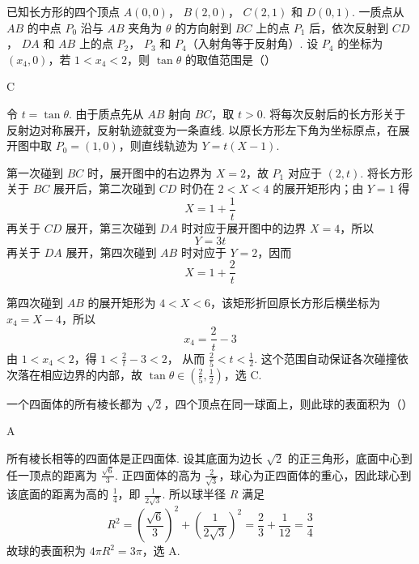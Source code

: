 \begin{problem}
已知长方形的四个顶点 \(A(0, 0)\)， \(B(2, 0)\)， \(C(2, 1)\) 和 \(D(0, 1)\). 一质点从 \(AB\) 的中点 \(P_0\) 沿与 \(AB\) 夹角为 \(\theta\) 的方向射到 \(BC\) 上的点 \(P_1\) 后，依次反射到 \(CD\)， \(DA\) 和 \(AB\) 上的点 \(P_2\)， \(P_3\) 和 \(P_4\)（入射角等于反射角）. 设 \(P_4\) 的坐标为 \( (x_4, 0) \)，若 \( 1 < x_4 < 2 \)，则 \( \tan \theta \) 的取值范围是（\quad）
\begin{answer}
C
\end{answer}

\begin{solution}
令 \(t=\tan\theta\). 由于质点先从 \(AB\) 射向 \(BC\)，取 \(t>0\). 将每次反射后的长方形关于反射边对称展开，反射轨迹就变为一条直线. 以原长方形左下角为坐标原点，在展开图中取 \(P_{0}=(1,0)\)，则直线轨迹为
\(Y=t(X-1)\).

第一次碰到 \(BC\) 时，展开图中的右边界为 \(X=2\)，故 \(P_{1}\) 对应于 \((2,t)\). 将长方形关于 \(BC\) 展开后，第二次碰到 \(CD\) 时仍在 \(2<X<4\) 的展开矩形内；由 \(Y=1\) 得
\[
X=1+\frac{1}{t}
\]
再关于 \(CD\) 展开，第三次碰到 \(DA\) 时对应于展开图中的边界 \(X=4\)，所以
\[
Y=3t
\]
再关于 \(DA\) 展开，第四次碰到 \(AB\) 时对应于 \(Y=2\)，因而
\[
X=1+\frac{2}{t}
\]

第四次碰到 \(AB\) 的展开矩形为 \(4<X<6\)，该矩形折回原长方形后横坐标为 \(x_{4}=X-4\)，所以
\[
x_{4}=\frac{2}{t}-3
\]
由 \(1<x_{4}<2\)，得
\(1<\frac{2}{t}-3<2\)，
从而 \(\frac{2}{5}<t<\frac{1}{2}\). 这个范围自动保证各次碰撞依次落在相应边界的内部，故 \(\tan\theta\in\left(\frac{2}{5},\frac{1}{2}\right)\)，选 C.
\end{solution}
\end{problem}

\begin{problem}
一个四面体的所有棱长都为 \( \sqrt{2} \)，四个顶点在同一球面上，则此球的表面积为（\quad）
\begin{answer}
A
\end{answer}

\begin{solution}
所有棱长相等的四面体是正四面体. 设其底面为边长 \(\sqrt{2}\) 的正三角形，底面中心到任一顶点的距离为 \(\frac{\sqrt{6}}{3}\). 正四面体的高为 \(\frac{2}{\sqrt{3}}\)，球心为正四面体的重心，因此球心到该底面的距离为高的 \(\frac{1}{4}\)，即 \(\frac{1}{2\sqrt{3}}\). 所以球半径 \(R\) 满足
\[
R^{2}=\left(\frac{\sqrt{6}}{3}\right)^{2}+\left(\frac{1}{2\sqrt{3}}\right)^{2}=\frac{2}{3}+\frac{1}{12}=\frac{3}{4}
\]
故球的表面积为 \(4\pi R^{2}=3\pi\)，选 A.
\end{solution}
\end{problem}

